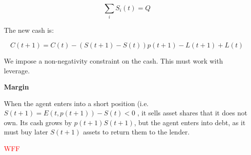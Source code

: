 \documentclass{article}
\begin{document}
\begin{equation}
    \sum_i S_i(t) = Q
\end{equation}

The new cash is:

\begin{equation}
    C(t+1) = C(t) - (S(t+1) - S(t))p(t+1) - L(t+1) + L(t)
\end{equation}

We impose a non-negativity constraint on the cash. 
This must work with leverage.

\textbf{Margin}

When the agent enters into a short position (i.e. $S(t+1) = E(t,p(t+1)) - S(t) < 0$ , it sells asset shares that it does not own. Its cash grows by $p(t+1)S(t+1)$, but the agent enters into debt, as it must buy later $S(t+1)$ assets to return them to the lender.

\textcolor{red}{WFF}



\end{document}
